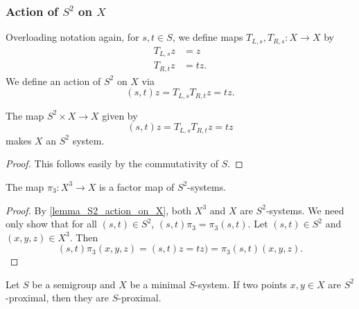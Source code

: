 

\subsubsection{Action of $S^2$ on $X$}

Overloading notation again, for $s, t \in S$, we define maps $T_{L,s}, T_{R,s}: X \to X$ by
\begin{align*}
    T_{L,s}z &= z\\
    T_{R,t}z &= tz.
\end{align*}
We define an action of $S^2$ on $X$ via
\[(s,t)z = T_{L,s}T_{R,t}z = tz.\]

\begin{lemma}[Action of $S^2$ on $X$]
    \label{lemma_S2_action_on_X}
    \leanok{}
    The map $S^2 \times X \to X$ given by
    \[(s,t)z = T_{L,s}T_{R,t}z = tz\]
    makes $X$ an $S^2$ system.
\end{lemma}

\begin{proof}
\leanok{}
    This follows easily by the commutativity of $S$.
\end{proof}

\begin{lemma}
    \label{lemma_x3_to_x_is_S2_factor_map}
    \leanok{}
    The map $\pi_3: X^3 \to X$ is a factor map of $S^2$-systems.
\end{lemma}

\begin{proof}
\leanok{}
    By \cref{lemma_S2_action_on_X}, both $X^3$ and $X$ are $S^2$-systems.  We need only show that for all $(s,t) \in S^2$, $(s,t) \pi_{3} = \pi_{3} (s,t)$. Let $(s,t) \in S^2$ and $(x,y,z) \in X^3$.  Then
    \[(s,t) \pi_{3} (x,y,z) = (s,t)z = tz) = \pi_{3} (s,t) (x,y,z).\]
\end{proof}

\begin{lemma}
    \label{lemma_prox_in_h_implies_in_g}
    \leanok{}
    Let $S$ be a semigroup and $X$ be a minimal $S$-system. If two points $x, y \in X$ are $S^2$-proximal, then they are $S$-proximal.
\end{lemma}

